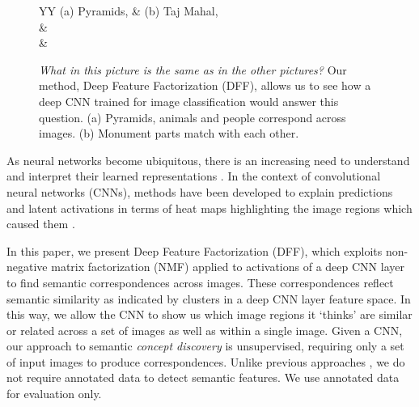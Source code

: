 \documentclass[runningheads]{llncs}
\begin{document}
	
	\begin{figure}[b]
		\centering
		\begin{tabularx}{\textwidth}{YY}
			(a) Pyramids,  & (b) Taj Mahal,  \\
			&  \\
			 &   \\

		\end{tabularx}
		
		\caption{\emph{What in this picture is the same as in the other pictures?} Our method,  Deep Feature Factorization (DFF), allows us to see how a deep CNN trained for image classification would answer this question. (a) Pyramids, animals and people correspond across images.  (b) Monument parts match with each other.  } \label{fig:icoseg1}

	\end{figure}
	
	As neural networks become ubiquitous, there is an increasing need to understand and interpret their learned representations \cite{Montavon2017,Ribeiro2016}. In the context of convolutional neural networks (CNNs), methods have been developed to explain predictions and latent activations in terms of heat maps highlighting the image regions which caused them \cite{Zhou2016,selvaraju2016grad}.
	
	In this paper, we present Deep Feature Factorization (DFF), which exploits non-negative matrix factorization (NMF) \cite{lee1999learning} applied to activations of a deep CNN layer to find semantic correspondences across images. These correspondences reflect semantic similarity as indicated by clusters in a deep CNN layer feature space. In this way, we allow the CNN to show us which image regions it `thinks' are similar or related across a set of images as well as within a single image. Given a CNN, our approach to semantic \emph{concept discovery} is unsupervised, requiring only a set of input images to produce correspondences. Unlike previous approaches \cite{Bau2017,Gonzalez2017},  we do not require annotated data to detect semantic features. We use annotated data for evaluation only.
	
\end{document}
